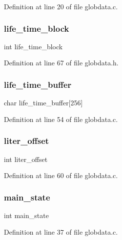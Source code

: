 Definition at line 20 of file globdata.\+c.

\mbox{\label{globdata_8h_aa301d715ce1013286a2d0bf7adb6b8af}} 
\subsubsection{life\+\_\+time\+\_\+block}
{\footnotesize\ttfamily int life\+\_\+time\+\_\+block}



Definition at line 67 of file globdata.\+h.

\mbox{\label{globdata_8h_a88d2d73bff40e3b4a4853e2f4a420098}} 
\subsubsection{life\+\_\+time\+\_\+buffer}
{\footnotesize\ttfamily char life\+\_\+time\+\_\+buffer[256]}



Definition at line 54 of file globdata.\+c.

\mbox{\label{globdata_8h_a2d0b3bc49a15d13c30284763b458dd55}} 
\subsubsection{liter\+\_\+offset}
{\footnotesize\ttfamily int liter\+\_\+offset}



Definition at line 60 of file globdata.\+c.

\mbox{\label{globdata_8h_af4056f02cdd1c220c82e2ff7d5b35caf}} 
\subsubsection{main\+\_\+state}
{\footnotesize\ttfamily int main\+\_\+state}



Definition at line 37 of file globdata.\+c.

